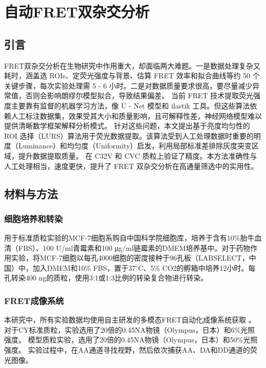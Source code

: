 \chapter{自动FRET双杂交分析}

\section{引言}

\ifshowtext
FRET双杂交分析在生物研究中作用重大，却面临两大难题。一是数据处理复杂又耗时，涵盖选 ROIs、定荧光强度与背景、估算 FRET 效率和拟合曲线等约 50 个关键步骤，每次实验处理需 5 - 6 小时。二是对数据质量要求很高，要尽量减少异常值，否则会影响朗缪尔模型拟合，导致结果偏差。
当前 FRET 技术提取荧光强度主要靠有监督的机器学习方法，像 U - Net 模型和 ilastik 工具。但这些算法依赖人工标注数据集，效果受其大小和质量影响，且可解释性差，神经网络模型难以提供清晰数学框架解释分析模式。
针对这些问题，本文提出基于亮度均匀性的 ROI 选择（LURS）算法用于荧光数据提取。该算法受到人工处理数据时重要的明度（Luminance）和均匀度（Uniformity）启发，利用局部标准差排除灰度突变区域，提升数据提取质量。
在 C32V 和 CVC 质粒上验证了精度。本方法准确性与人工处理相当，速度更快，提升了 FRET 双杂交分析在高通量筛选中的实用性。
\fi

\section{材料与方法}

\ifshowtext
\fi

\subsection{细胞培养和转染}
\label{sec:细胞转染}
\ifshowtext
用于标准质粒实验的MCF-7细胞系购自中国科学院细胞库，培养于含有10\%胎牛血清（FBS）、100 U/ml青霉素和100 μg/ml链霉素的DMEM培养基中。对于药物作用实验，将MCF-7细胞以每孔4000细胞的密度接种于96孔板（LABSELECT，中国）中，加入DMEM和10\% FBS，置于37$^\circ \text{C}$、5\% CO2的孵箱中培养12小时。每孔转染400 ng的质粒，使用3:1或1:3比例的转染复合物进行转染。
\fi

\subsection{FRET成像系统}
\label{sec:成像条件}
\ifshowtext
本研究中，所有实验数据均使用自主研发的多模态FRET自动化成像系统获取 。
对于CY标准质粒，实验选用了20倍的0.45NA物镜（Olympus，日本）和6\%光照强度。
模型质粒实验，选用了20倍的0.45NA物镜（Olympus，日本）和50\%光照强度。
实验过程中，在AA通道寻找视野，然后依次捕获AA、DA和DD通道的荧光图像。

